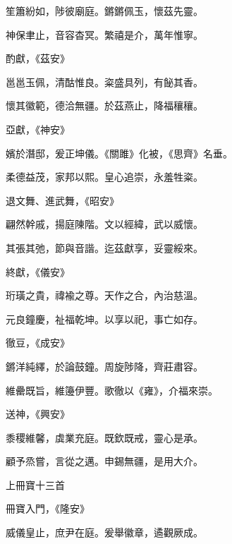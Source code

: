 \begin{pinyinscope}
 笙簫紛如，陟彼廟庭。鏘鏘佩玉，懷茲先靈。



 神保聿止，音容杳冥。繁禧是介，萬年惟寧。



 酌獻，《茲安》



 邕邕玉佩，清酤惟良。粢盛具列，有飶其香。



 懷其徽範，德洽無疆。於茲燕止，降福穰穰。



 亞獻，《神安》



 嬪於潛邸，爰正坤儀。《關雎》化被，《思齊》名垂。



 柔德益茂，家邦以熙。皇心追崇，永羞牲粢。



 退文舞、進武舞，《昭安》



 翩然幹戚，揚庭陳階。文以經緯，武以威懷。



 其張其弛，節與音諧。迄茲獻享，妥靈綏來。



 終獻，《儀安》



 珩璜之貴，禕褕之尊。天作之合，內治慈溫。



 元良鐘慶，祉福乾坤。以享以祀，事亡如存。



 徹豆，《成安》



 鏘洋純繹，於論鼓鐘。周旋陟降，齊莊肅容。



 維罍既旨，維籩伊豐。歌徹以《雍》，介福來崇。



 送神，《興安》



 黍稷維馨，虡業充庭。既欽既戒，靈心是承。



 顧予烝嘗，言從之邁。申錫無疆，是用大介。



 上冊寶十三首



 冊寶入門，《隆安》



 威儀皇止，庶尹在庭。爰舉徽章，遹觀厥成。




\end{pinyinscope}
